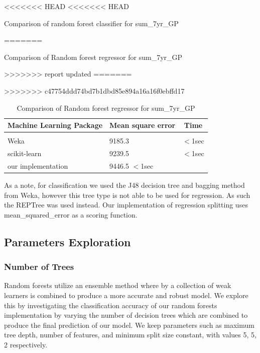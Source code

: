 \documentclass{article} %
\begin{document}
\begin{table}[h]
<<<<<<< HEAD
<<<<<<< HEAD
\caption{Comparison of random forest classifier for sum\_7yr\_GP}
=======
\caption{Comparison of Random forest regressor for sum\_7yr\_GP}
>>>>>>> report updated
=======
\caption{Comparison of Random forest regressor for sum\_7yr\_GP}
>>>>>>> c47754ddd74bd7b1dbd85e894a16a16f0ebffd17
\label{reg-table}
\begin{center}
\begin{tabular}{lll}
\multicolumn{1}{c}{\bf Machine Learning Package} &\multicolumn{1}{c}{\bf Mean square error} &\multicolumn{1}{c}{\bf Time}
\\ \hline \\
Weka         &9185.3	&$<$1sec \\
scikit-learn             &9239.5	&$<$1sec \\
our implementation             &9446.5	$<$1sec \\
\end{tabular}
\end{center}
\end{table}

As a note, for classification we used the J48 decision tree and bagging method from Weka, however this tree type is not able to be used for regression. As such the REPTree was used instead. Our implementation of regression splitting uses mean_squared_error as a scoring function.\cite{Brieman84} 
\subsection{Parameters Exploration}

\subsubsection{Number of Trees}

Random forests utilize an ensemble method where by a collection of weak learners is combined to produce a more accurate and robust model. We explore this by investigating the classification accuracy of our random forests implementation by varying the number of decision trees which are combined to produce the final prediction of our model. We keep parameters such as maximum tree depth, number of features, and minimum split size constant, with values 5, 5, 2 respectively.
\end{document}
